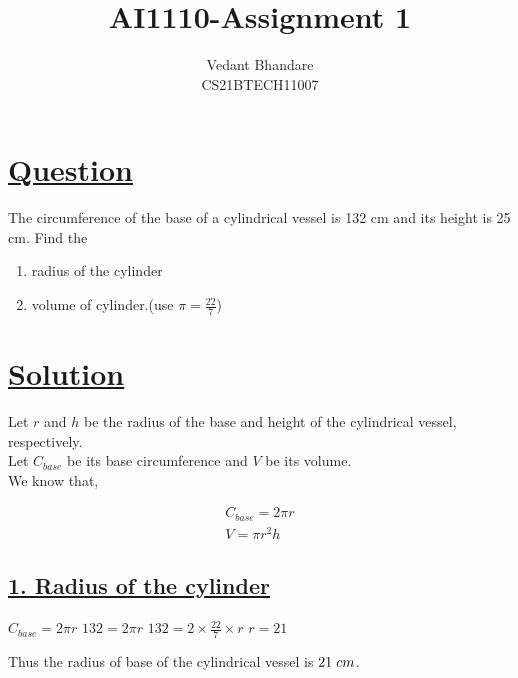 \documentclass[journal,12pt,twocolumn]{IEEEtran}
\begin{document}
\raggedbottom
\setlength{\parindent}{0pt}
\vspace{3cm}
\title{AI1110-Assignment 1}
\author{Vedant Bhandare\\CS21BTECH11007}
\maketitle
\newpage
\bigskip
\renewcommand{\thefigure}{\theenumi}
\renewcommand{\thetable}{\theenumi}

\section*{\underline{\textbf{Question}}}
The circumference of the base of a cylindrical vessel is 132 cm and its height is 25 cm. Find the

\begin{enumerate}
    \item radius of the cylinder
    \item volume of cylinder.(use $\pi = \frac{22}{7}$)
\end{enumerate}
\section*{\underline{\textbf{Solution}}}
Let $r$ and $h$ be the radius of the base and height of the cylindrical vessel, respectively.\\
Let $C_{base}$ be its base circumference and $V$ be its volume.\\

We know that,

\begin{align}
    C_{base} = 2\pi{r}\\
    V = \pi{r^2h}
\end{align}

\subsection*{\underline{\textbf{1. Radius of the cylinder}}}
\vspace{2mm}
\large{$C_{base} = 2\pi{r}$}
\vspace{1mm}
$132 = 2\pi{r}$
\vspace{1mm}
$132 = 2\times\frac{22}{7}\times{r}$
\vspace{1mm}
$r = 21$
\begin{center}
    Thus the radius of base of the cylindrical vessel is $21 \hspace{1mm}cm$.
\end{center}
\vspace{2mm}
\end{document}
